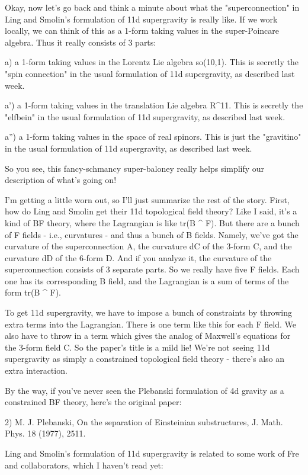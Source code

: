 Okay, now let's go back and think a minute about what the
"superconnection" in Ling and Smolin's formulation of 11d
supergravity is really like.  If we work locally, we can think of this
as a 1-form taking values in the super-Poincare algebra.  Thus it really
consists of 3 parts:

a) a 1-form taking values in the Lorentz Lie algebra so(10,1).  
This is secretly the "spin connection" in the usual formulation of 
11d supergravity, as described last week.

a') a 1-form taking values in the translation Lie algebra R^{11}.    
This is secretly the "elfbein" in the usual formulation of 11d
supergravity, as described last week.

a'') a 1-form taking values in the space of real spinors.  This is 
just the "gravitino" in the usual formulation of 11d supergravity,
as described last week.

So you see, this fancy-schmancy super-baloney really helps simplify 
our description of what's going on!

I'm getting a little worn out, so I'll just summarize the rest of
the story.  First, how do Ling and Smolin get their 11d topological
field theory?  Like I said, it's a kind of BF theory, where the
Lagrangian is like tr(B ^ F).  But there are a bunch of F fields - 
i.e., curvatures - and thus a bunch of B fields.  Namely, we've got 
the curvature of the superconnection A, the curvature dC of the 3-form C,
and the curvature dD of the 6-form D.  And if you analyze it, the
curvature of the superconnection consists of 3 separate parts.  So we
really have five F fields.  Each one has its corresponding B field, and
the Lagrangian is a sum of terms of the form tr(B ^ F).  

To get 11d supergravity, we have to impose a bunch of constraints by
throwing extra terms into the Lagrangian.  There is one term like this
for each F field.   We also have to throw in a term which gives the
analog of Maxwell's equations for the 3-form field C.  So the paper's
title is a mild lie!  We're not seeing 11d supergravity as simply a
constrained topological field theory - there's also an extra interaction.

By the way, if you've never seen the Plebanski formulation of 4d gravity
as a constrained BF theory, here's the original paper:

2) M. J. Plebanski, On the separation of Einsteinian substructures,
J. Math. Phys. 18 (1977), 2511.

Ling and Smolin's formulation of 11d supergravity is related to some
work of Fre and collaborators, which I haven't read yet:

